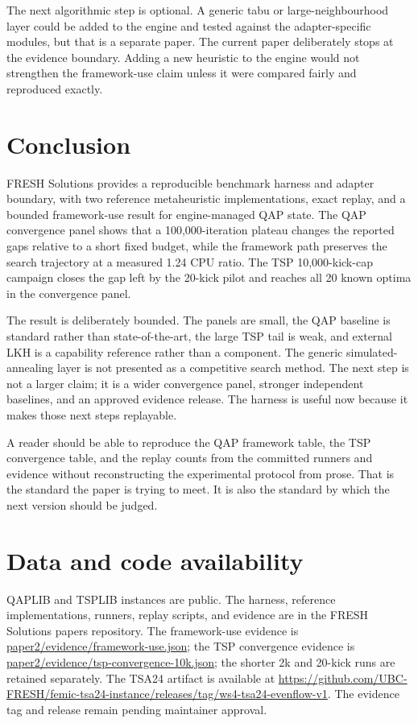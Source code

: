 \documentclass[pdflatex,sn-mathphys-num]{sn-jnl}
\begin{document}
The next algorithmic step is optional. A generic tabu or large-neighbourhood layer could be added to
the engine and tested against the adapter-specific modules, but that is a separate paper. The current
paper deliberately stops at the evidence boundary. Adding a new heuristic to the engine would not
strengthen the framework-use claim unless it were compared fairly and reproduced exactly.

\section{Conclusion}

FRESH Solutions provides a reproducible benchmark harness and adapter boundary, with two reference
metaheuristic implementations, exact replay, and a bounded framework-use result for engine-managed
QAP state. The QAP convergence panel shows that a 100,000-iteration plateau changes the reported gaps
relative to a short fixed budget, while the framework path preserves the search trajectory at a
measured 1.24 CPU ratio. The TSP 10,000-kick-cap campaign closes the gap left by the 20-kick pilot and
reaches all 20 known optima in the convergence panel.

The result is deliberately bounded. The panels are small, the QAP baseline is standard rather than
state-of-the-art, the large TSP tail is weak, and external LKH is a capability reference rather than a
component. The generic simulated-annealing layer is not presented as a competitive search method. The
next step is not a larger claim; it is a wider convergence panel, stronger independent baselines, and
an approved evidence release. The harness is useful now because it makes those next steps replayable.

A reader should be able to reproduce the QAP framework table, the TSP convergence table, and the
replay counts from the committed runners and evidence without reconstructing the experimental
protocol from prose. That is the standard the paper is trying to meet. It is also the standard by
which the next version should be judged.

\section*{Data and code availability}
QAPLIB and TSPLIB instances are public. The harness, reference implementations, runners, replay
scripts, and evidence are in the FRESH Solutions papers repository. The framework-use evidence is
\url{paper2/evidence/framework-use.json}; the TSP convergence evidence is
\url{paper2/evidence/tsp-convergence-10k.json}; the shorter 2k and 20-kick runs are retained
separately. The TSA24 artifact is available at
\url{https://github.com/UBC-FRESH/femic-tsa24-instance/releases/tag/ws4-tsa24-evenflow-v1}.
The evidence tag and release remain pending maintainer approval.



\end{document}
